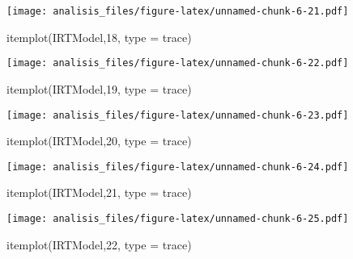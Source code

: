 \documentclass[
]{article}
\newenvironment{Shaded}{\begin{snugshade}}{\end{snugshade}}
\newcommand{\AttributeTok}[1]{\textcolor[rgb]{0.77,0.63,0.00}{#1}}
\newcommand{\DecValTok}[1]{\textcolor[rgb]{0.00,0.00,0.81}{#1}}
\newcommand{\FunctionTok}[1]{\textcolor[rgb]{0.00,0.00,0.00}{#1}}
\newcommand{\NormalTok}[1]{#1}
\newcommand{\StringTok}[1]{\textcolor[rgb]{0.31,0.60,0.02}{#1}}
\begin{document}
\texttt{[image: analisis\_files/figure-latex/unnamed-chunk-6-21.pdf]}

\begin{Shaded}
\begin{Highlighting}[]
\FunctionTok{itemplot}\NormalTok{(IRTModel,}\DecValTok{18}\NormalTok{, }\AttributeTok{type =} \StringTok{\textquotesingle{}trace\textquotesingle{}}\NormalTok{)}
\end{Highlighting}
\end{Shaded}

\texttt{[image: analisis\_files/figure-latex/unnamed-chunk-6-22.pdf]}

\begin{Shaded}
\begin{Highlighting}[]
\FunctionTok{itemplot}\NormalTok{(IRTModel,}\DecValTok{19}\NormalTok{, }\AttributeTok{type =} \StringTok{\textquotesingle{}trace\textquotesingle{}}\NormalTok{)}
\end{Highlighting}
\end{Shaded}

\texttt{[image: analisis\_files/figure-latex/unnamed-chunk-6-23.pdf]}

\begin{Shaded}
\begin{Highlighting}[]
\FunctionTok{itemplot}\NormalTok{(IRTModel,}\DecValTok{20}\NormalTok{, }\AttributeTok{type =} \StringTok{\textquotesingle{}trace\textquotesingle{}}\NormalTok{)}
\end{Highlighting}
\end{Shaded}

\texttt{[image: analisis\_files/figure-latex/unnamed-chunk-6-24.pdf]}

\begin{Shaded}
\begin{Highlighting}[]
\FunctionTok{itemplot}\NormalTok{(IRTModel,}\DecValTok{21}\NormalTok{, }\AttributeTok{type =} \StringTok{\textquotesingle{}trace\textquotesingle{}}\NormalTok{)}
\end{Highlighting}
\end{Shaded}

\texttt{[image: analisis\_files/figure-latex/unnamed-chunk-6-25.pdf]}

\begin{Shaded}
\begin{Highlighting}[]
\FunctionTok{itemplot}\NormalTok{(IRTModel,}\DecValTok{22}\NormalTok{, }\AttributeTok{type =} \StringTok{\textquotesingle{}trace\textquotesingle{}}\NormalTok{)}
\end{Highlighting}
\end{Shaded}
\end{document}
